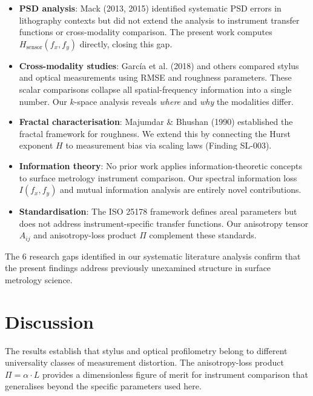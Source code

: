 \documentclass[review]{elsarticle}
\begin{document}
\begin{itemize}
    \item \textbf{PSD analysis}: Mack (2013, 2015) identified systematic PSD errors
    in lithography contexts but did not extend the analysis to instrument transfer
    functions or cross-modality comparison. The present work computes
    $H_\mathrm{sensor}(f_x,f_y)$ directly, closing this gap.

    \item \textbf{Cross-modality studies}: Garc\'{i}a et al. (2018) and others
    compared stylus and optical measurements using RMSE and roughness parameters.
    These scalar comparisons collapse all spatial-frequency information into a single
    number. Our $k$-space analysis reveals \emph{where} and \emph{why} the
    modalities differ.

    \item \textbf{Fractal characterisation}: Majumdar \& Bhushan (1990) established
    the fractal framework for roughness. We extend this by connecting the Hurst exponent
    $H$ to measurement bias via scaling laws (Finding SL-003).

    \item \textbf{Information theory}: No prior work applies information-theoretic
    concepts to surface metrology instrument comparison. Our spectral information
    loss $I(f_x,f_y)$ and mutual information analysis are entirely novel contributions.

    \item \textbf{Standardisation}: The ISO 25178 framework defines areal parameters
    but does not address instrument-specific transfer functions. Our anisotropy tensor
    $A_{ij}$ and anisotropy-loss product $\Pi$ complement these standards.
\end{itemize}

The 6 research gaps identified in our systematic literature analysis
confirm that the present findings address previously unexamined structure in
surface metrology science.


\section{Discussion}
\label{sec:discussion}

The results establish that stylus and optical profilometry belong to different
universality classes of measurement distortion. The anisotropy-loss product
$\Pi = \alpha \cdot L$ provides a dimensionless figure of merit for instrument
comparison that generalises beyond the specific parameters used here.
\end{document}
